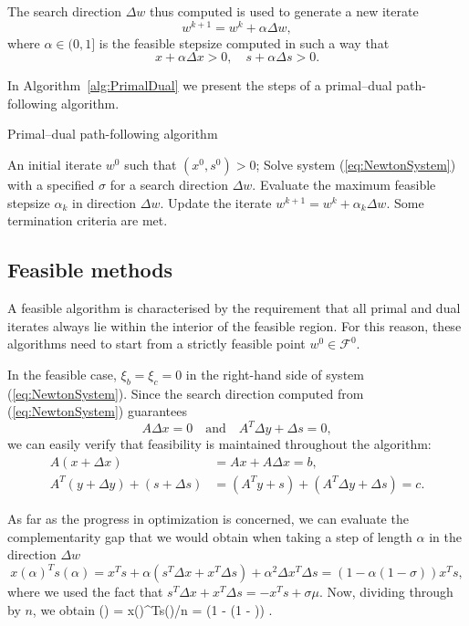 The search direction $\Delta w$ thus computed is used to generate 
a new iterate
\[
  w^{k+1} = w^k + \alpha\Delta w,
\]
where $\alpha \in (0,1]$ is the feasible stepsize computed in
such a way that
\[
   x + \alpha \Delta x > 0, \quad s + \alpha \Delta s > 0.
\]

In Algorithm~\ref{alg:PrimalDual} we present the steps of a 
primal--dual path-following algorithm.

\begin{algorithm}[ḧt]
  \caption{Primal--dual path-following algorithm}
    \begin{algorithmic}[0]  \label{alg:PrimalDual}
      \REQUIRE An initial iterate $w^0$ such that $(x^0, s^0) > 0$;
      \smallskip
      \REPEAT
        \STATE Solve system (\ref{eq:NewtonSystem}) with a specified $\sigma$
	       for a search direction $\Delta w$.
        \smallskip
        \STATE Evaluate the maximum feasible stepsize $\alpha_k$ in 
	       direction $\Delta w$.
        \smallskip
        \STATE Update the iterate $w^{k+1} = w^k + \alpha_k\Delta w$.
        \smallskip
      \UNTIL Some termination criteria are met.
    \end{algorithmic}
\end{algorithm}

%
%
\subsection{Feasible methods}
\label{sec:FeasibleMethods}

A feasible algorithm is characterised by the requirement that
all primal and dual iterates always lie within the interior 
of the feasible region. For this reason, these algorithms 
need to start from a strictly feasible point $w^0 \in\mathcal{F}^0$.

In the feasible case, $\xi_b = \xi_c = 0$
in the right-hand side of system (\ref{eq:NewtonSystem}). 
Since
the search direction computed from (\ref{eq:NewtonSystem})
guarantees
\[
  A \Delta x = 0 \quad \text{and} \quad
  A^T \Delta y + \Delta s = 0,
\]
we can easily verify that feasibility is maintained 
throughout the algorithm: 
\[
  \begin{split}
  A (x + \Delta x) &= Ax + A\Delta x = b, \\
  A^T(y +\Delta y) + (s +\Delta s) &= (A^T y +s) + (A^T\Delta y +\Delta s) = c.
  \end{split}
\]

As far as the progress in optimization is concerned,
we can evaluate the complementarity gap that we would
obtain when taking a step of length $\alpha$ in the direction $\Delta w$
\[
   x(\alpha)^Ts(\alpha) = x^Ts + \alpha(s^T \Delta x + x^T \Delta s)
     + \alpha^2 \Delta x^T \Delta s = (1 - \alpha (1 - \sigma)) x^Ts,
\]
where we used the fact that
$s^T \Delta x + x^T \Delta s = -x^Ts + \sigma\mu$.
Now, dividing through by $n$, we obtain
\be  \label{eq:OptimalityProgress}
   \mu(\alpha) = x(\alpha)^Ts(\alpha)/n = (1 - \alpha (1 - \sigma)) \mu.
\ee

